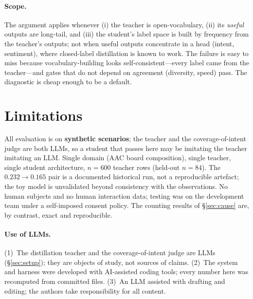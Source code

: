 \documentclass{article}
\begin{document}
\paragraph{Scope.} The argument applies whenever (i) the teacher is
open-vocabulary, (ii) its \emph{useful} outputs are long-tail, and (iii) the
student's label space is built by frequency from the teacher's outputs; not
when useful outputs concentrate in a head (intent, sentiment), where
closed-label distillation is known to work. The failure is easy to miss
because vocabulary-building looks self-consistent---every label came from the
teacher---and gates that do not depend on agreement (diversity, speed) pass.
The diagnostic is cheap enough to be a default.

\section{Limitations}
All evaluation is on \textbf{synthetic scenarios}; the teacher and the
coverage-of-intent judge are both LLMs, so a student that passes here may be
imitating the teacher imitating an LLM. Single domain (AAC board composition),
single teacher, single student architecture, $n=600$ teacher rows (held-out
$n=84$). The $0.232\to0.165$ pair is a documented historical run, not a
reproducible artefact; the toy model is unvalidated beyond consistency with
the observations. No human subjects and no human interaction data; testing was
on the development team under a self-imposed consent policy. The counting
results of \S\ref{sec:cause} are, by contrast, exact and reproducible.

\paragraph{Use of LLMs.} (1)~The distillation teacher and the
coverage-of-intent judge are LLMs (\S\ref{sec:setup}); they are objects of
study, not sources of claims. (2)~The system and harness were developed
with AI-assisted coding tools; every number here was recomputed from committed
files. (3)~An LLM assisted with drafting
and editing; the authors take responsibility for all content.
\end{document}
